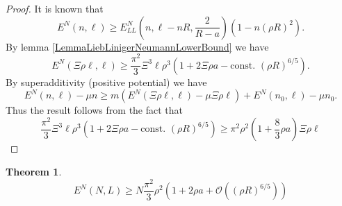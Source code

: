 \documentclass[a4paper,11pt]{article}
\newtheorem{theorem}{Theorem}
\numberwithin{equation}{section}
\begin{document}
	\begin{proof}
		It is known that \begin{equation}
		E^{N}(n,\ell)\geq E_{LL}^N\left(n,\ell-nR,\frac{2}{R-a}\right)\left(1-n(\rho R)^2\right).
		\end{equation}
		By lemma \ref{LemmaLiebLinigerNeumannLowerBound} we have \begin{equation}
		E^{N}(\Xi\rho\ell,\ell)\geq\frac{\pi^2}{3}\Xi^3\ell\rho^3\left(1+2\Xi\rho a-\text{const. }(\rho R)^{6/5}\right).
		\end{equation}
		By superadditivity (positive potential) we have \begin{equation}
		E^N(n,\ell)-\mu n\geq m\left(E^N(\Xi\rho\ell,\ell)-\mu\Xi\rho\ell \right)+E^N(n_0,\ell)-\mu n_0.
		\end{equation}
		Thus the result follows from the fact that \begin{equation}
		\frac{\pi^2}{3}\Xi^3\ell\rho^3\left(1+2\Xi\rho a-\text{const. }(\rho R)^{6/5}\right)\geq \pi^2\rho^2\left(1+\frac{8}{3}\rho a\right) \Xi\rho\ell
		\end{equation}
	\end{proof}
	\begin{theorem}
		\begin{equation}
		E^N(N,L)\geq N\frac{\pi^2}{3}\rho^2\left(1+2\rho a+\mathcal{O}\left((\rho R)^{6/5}\right)\right)
		\end{equation}
	\end{theorem}
\end{document}
